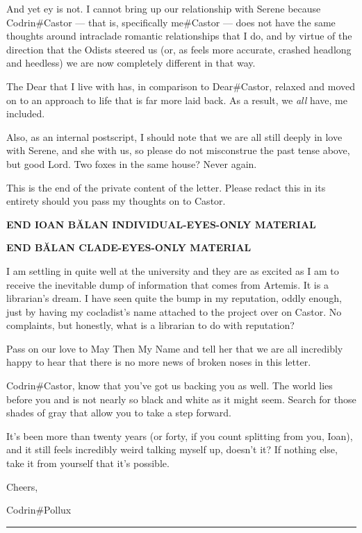 And yet ey is not. I cannot bring up our relationship with Serene because Codrin\#Castor — that is, specifically me\#Castor — does not have the same thoughts around intraclade romantic relationships that I do, and by virtue of the direction that the Odists steered us (or, as feels more accurate, crashed headlong and heedless) we are now completely different in that way.

The Dear that I live with has, in comparison to Dear\#Castor, relaxed and moved on to an approach to life that is far more laid back. As a result, we \emph{all} have, me included.

Also, as an internal postscript, I should note that we are all still deeply in love with Serene, and she with us, so please do not misconstrue the past tense above, but good Lord. Two foxes in the same house? Never again.

This is the end of the private content of the letter. Please redact this in its entirety should you pass my thoughts on to Castor.

\textbf{END IOAN BĂLAN INDIVIDUAL-EYES-ONLY MATERIAL}

\textbf{END BĂLAN CLADE-EYES-ONLY MATERIAL}

I am settling in quite well at the university and they are as excited as I am to receive the inevitable dump of information that comes from Artemis. It is a librarian's dream. I have seen quite the bump in my reputation, oddly enough, just by having my cocladist's name attached to the project over on Castor. No complaints, but honestly, what is a librarian to do with reputation?

Pass on our love to May Then My Name and tell her that we are all incredibly happy to hear that there is no more news of broken noses in this letter.

Codrin\#Castor, know that you've got us backing you as well. The world lies before you and is not nearly so black and white as it might seem. Search for those shades of gray that allow you to take a step forward.

It's been more than twenty years (or forty, if you count splitting from you, Ioan), and it still feels incredibly weird talking myself up, doesn't it? If nothing else, take it from yourself that it's possible.

Cheers,

Codrin\#Pollux

\begin{center}\rule{0.5\linewidth}{0.5pt}\end{center}

